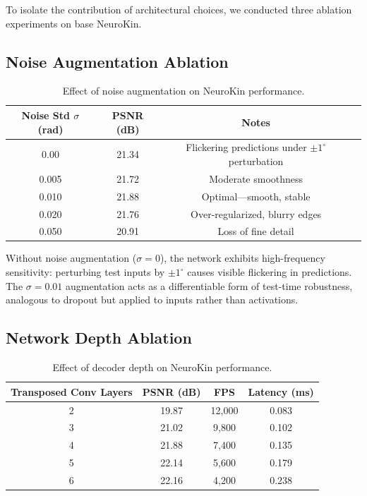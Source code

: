 \documentclass[12pt,a4paper,oneside]{report}
\begin{document}
To isolate the contribution of architectural choices, we conducted three ablation experiments on base NeuroKin.

\subsection{Noise Augmentation Ablation}

\begin{table}[H]
\centering
\caption{Effect of noise augmentation on NeuroKin performance.}
\label{tab:noise_ablation}
\begin{tabular}{cccc}
\toprule
Noise Std $\sigma$ (rad) & PSNR (dB) & Notes \\
\midrule
0.00 & 21.34 & Flickering predictions under $\pm1^\circ$ perturbation \\
0.005 & 21.72 & Moderate smoothness \\
0.010 & 21.88 & Optimal—smooth, stable \\
0.020 & 21.76 & Over-regularized, blurry edges \\
0.050 & 20.91 & Loss of fine detail \\
\bottomrule
\end{tabular}
\end{table}

Without noise augmentation ($\sigma = 0$), the network exhibits high-frequency sensitivity: perturbing test inputs by $\pm1^\circ$ causes visible flickering in predictions. The $\sigma = 0.01$ augmentation acts as a differentiable form of test-time robustness, analogous to dropout but applied to inputs rather than activations.

\subsection{Network Depth Ablation}

\begin{table}[H]
\centering
\caption{Effect of decoder depth on NeuroKin performance.}
\label{tab:depth_ablation}
\begin{tabular}{cccc}
\toprule
Transposed Conv Layers & PSNR (dB) & FPS & Latency (ms) \\
\midrule
2 & 19.87 & 12,000 & 0.083 \\
3 & 21.02 & 9,800 & 0.102 \\
4 & 21.88 & 7,400 & 0.135 \\
5 & 22.14 & 5,600 & 0.179 \\
6 & 22.16 & 4,200 & 0.238 \\
\bottomrule
\end{tabular}
\end{table}
\end{document}
